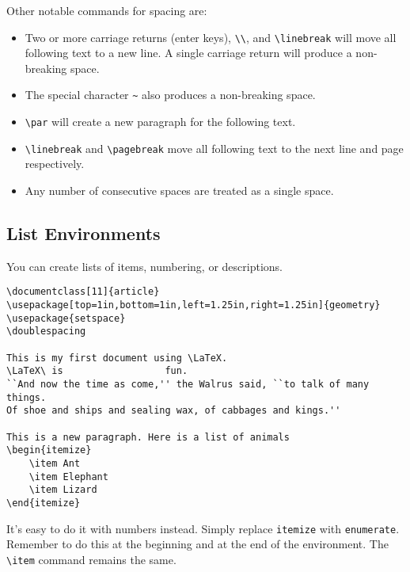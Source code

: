 Other notable commands for spacing are:
\begin{itemize}
\item Two or more carriage returns (enter keys), \verb|\\|, and \verb|\linebreak| will move all following text to a new line. A single carriage return will produce a non-breaking space.

\item The special character \verb|~| also produces a non-breaking space.

\item \verb|\par| will create a new paragraph for the following text.

\item \verb|\linebreak| and \verb|\pagebreak| move all following text to the next line and page respectively.

\item Any number of consecutive spaces are treated as a single space.
\end{itemize}

\subsection{List Environments}

You can create lists of items, numbering, or descriptions.

\begin{lstlisting}
\documentclass[11]{article}
\usepackage[top=1in,bottom=1in,left=1.25in,right=1.25in]{geometry}
\usepackage{setspace}
\doublespacing

This is my first document using \LaTeX.
\LaTeX\ is                  fun.
``And now the time as come,'' the Walrus said, ``to talk of many things.
Of shoe and ships and sealing wax, of cabbages and kings.''

This is a new paragraph. Here is a list of animals
\begin{itemize}
	\item Ant
	\item Elephant
	\item Lizard
\end{itemize}

\end{lstlisting}

It's easy to do it with numbers instead. Simply replace \texttt{itemize} with \texttt{enumerate}. Remember to do this at the beginning and at the end of the environment. The \verb|\item| command remains the same.

